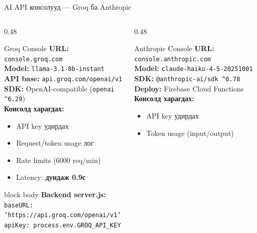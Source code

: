 \documentclass[14pt,aspectratio=169]{beamer}
\begin{document}
\begin{frame}{AI API консолууд — Groq ба Anthropic}
  \begin{columns}[T]
    \begin{column}{0.48\textwidth}
      \begin{block}{Groq Console}
        \textbf{URL:} \texttt{console.groq.com}\\[4pt]
        \textbf{Model:} \texttt{llama-3.1-8b-instant}\\
        \textbf{API base:} \texttt{api.groq.com/openai/v1}\\
        \textbf{SDK:} OpenAI-compatible (\texttt{openai \^{}6.29})\\[4pt]
        \textbf{Консолд харагдах:}
        \begin{itemize}
          \item API key удирдах
          \item Request/token usage лог
          \item Rate limits (6000 req/min)
          \item Latency: \textbf{дундаж 0.9с}
        \end{itemize}
        \vspace{4pt}
        \begin{beamercolorbox}[sep=3pt,rounded=true]{block body}
          \tiny\textbf{Backend server.js:}\\
          \texttt{baseURL: 'https://api.groq.com/openai/v1'}\\
          \texttt{apiKey: process.env.GROQ\_API\_KEY}
        \end{beamercolorbox}
      \end{block}
    \end{column}
    \begin{column}{0.48\textwidth}
      \begin{block}{Anthropic Console}
        \textbf{URL:} \texttt{console.anthropic.com}\\[4pt]
        \textbf{Model:} \texttt{claude-haiku-4-5-20251001}\\
        \textbf{SDK:} \texttt{@anthropic-ai/sdk \^{}0.78}\\
        \textbf{Deploy:} Firebase Cloud Functions\\[4pt]
        \textbf{Консолд харагдах:}
        \begin{itemize}
          \item API key удирдах
          \item Token usage (input/output)

\end{itemize}
\end{block}
\end{column}
\end{columns}
\end{frame}
\end{document}

